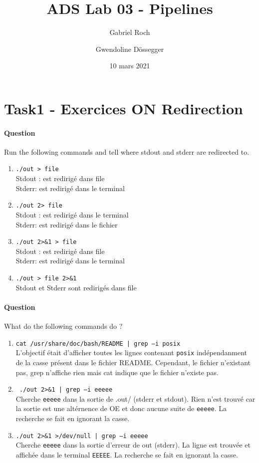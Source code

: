 \documentclass[a4paper,11pt]{article}
\title{ADS Lab 03 - Pipelines}
\date{10 mars 2021}
\author{Gabriel Roch \and Gwendoline Dössegger}
\newcounter{commande}[subsection]
\newcommand{\question}[1]{\addtocounter{commande}{1}

\paragraph{Question \arabic{commande}}#1\;}
\begin{document}
    \maketitle


    \section{Task1 - Exercices ON Redirection}
    \question{Run the following commands and tell where stdout and stderr are redirected to.}
    \begin{enumerate}
        \item \texttt{./out > file}       \\ Stdout : est redirigé dans file \\Stderr: est redirigé dans le terminal
        \item \texttt{./out 2> file}      \\ Stdout : est redirigé dans le terminal \\Stderr: est redirigé dans le fichier
        \item \texttt{./out 2>\&1 > file} \\ Stdout : est redirigé dans file\\Stderr: est redirigé dans le terminal
        \item \texttt{./out > file 2>\&1} \\ Stdout et Stderr sont redirigés dans file
    \end{enumerate}


    \question{What do the following commands do ?}
    \begin{enumerate}
        \item \texttt{cat /usr/share/doc/bash/README | grep –i posix} \\L'objectif était d'afficher toutes les lignes contenant \texttt{posix} indépendanment de la casse présent dans le fichier README. Cependant, le fichier n'existant pas, grep n'affiche rien mais cat indique que le fichier n'existe pas.
        \item \texttt{ ./out 2>\&1 | grep –i eeeee} \\Cherche \texttt{eeeee} dans la sortie de .out/ (stderr et stdout). Rien n'est trouvé car la sortie est une altérnence de OE et donc aucune suite de \texttt{eeeee}. La recherche se fait en ignorant la casse.
        \item \texttt{./out 2>\&1 >/dev/null | grep –i eeeee} \\Cherche \texttt{eeeee} dans la sortie d'erreur de out (stderr). La ligne est trouvée et affichée dans le terminal \texttt{EEEEE}. La recherche se fait en ignorant la casse.
    \end{enumerate}
\end{document}
